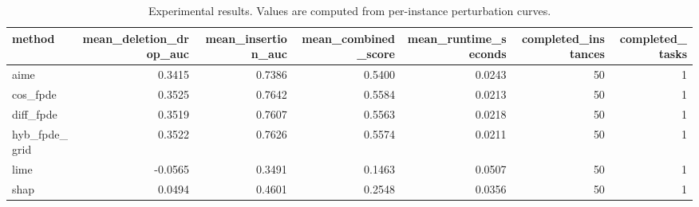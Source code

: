 \begin{table}[t]
\caption{Experimental results. Values are computed from per-instance perturbation curves.}
\label{tab:main_results_computed}
\centering
\begin{tabular}{lrrrrrr}
\toprule
method & mean\_deletion\_drop\_auc & mean\_insertion\_auc & mean\_combined\_score & mean\_runtime\_seconds & completed\_instances & completed\_tasks \\
\midrule
aime & 0.3415 & 0.7386 & 0.5400 & 0.0243 & 50 & 1 \\
cos\_fpde & 0.3525 & 0.7642 & 0.5584 & 0.0213 & 50 & 1 \\
diff\_fpde & 0.3519 & 0.7607 & 0.5563 & 0.0218 & 50 & 1 \\
hyb\_fpde\_grid & 0.3522 & 0.7626 & 0.5574 & 0.0211 & 50 & 1 \\
lime & -0.0565 & 0.3491 & 0.1463 & 0.0507 & 50 & 1 \\
shap & 0.0494 & 0.4601 & 0.2548 & 0.0356 & 50 & 1 \\
\bottomrule
\end{tabular}

\end{table}
